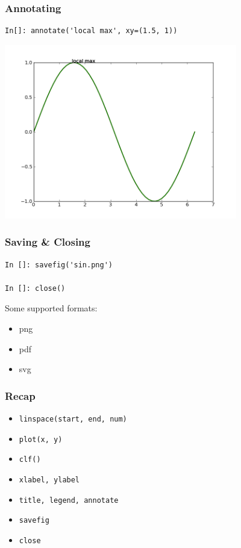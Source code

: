 \documentclass[14pt,compress]{beamer}
\newcounter{time}
\newcommand{\inctime}[1]{\addtocounter{time}{#1}{\tiny \thetime\ m}}
\newcommand{\typ}[1]{\lstinline{#1}}
\begin{document}
\begin{frame}[fragile]
\frametitle{Annotating}
\vspace*{-0.1in}
\begin{lstlisting}
In[]: annotate('local max', xy=(1.5, 1))
\end{lstlisting}
\vspace*{-0.2in}
\begin{center}
  \includegraphics[height=3in, interpolate=true]{data/annotate}
\end{center}
\end{frame}

\begin{frame}[fragile]
\frametitle{Saving \& Closing}
\begin{lstlisting}
In []: savefig('sin.png')

In []: close()
\end{lstlisting}
Some supported formats:
\begin{itemize}
\item png
\item pdf
\item svg
\end{itemize}
\end{frame}

\begin{frame}[fragile]
  \frametitle{Recap}
  \begin{itemize}
  \item \typ{linspace(start, end, num)}
  \item \typ{plot(x, y)}
  \item \typ{clf()}
  \item \typ{xlabel, ylabel}
  \item \typ{title, legend, annotate}
  \item \typ{savefig}
  \item \typ{close}
  \end{itemize}
  \inctime{10}
\end{frame}
\end{document}
